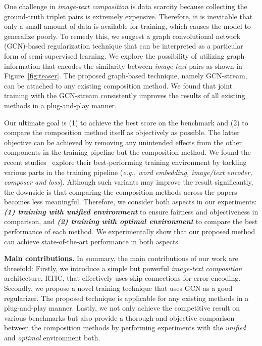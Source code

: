 \documentclass[10pt,twocolumn,letterpaper]{article}
\begin{document}
One challenge in \textit{image-text composition} is data scarcity because collecting the ground-truth triplet pairs is extremely expensive. Therefore, it is inevitable that only a small amount of data is available for training, which causes the model to generalize poorly. To remedy this, we suggest a graph convolutional network (GCN)-based regularization technique that can be interpreted as a particular form of semi-supervised learning. We explore the possibility of utilizing graph information that encodes the similarity between \textit{image-text} pairs as shown in Figure~\ref{fig:teaser}. The proposed graph-based technique, namely GCN-stream, can be attached to any existing composition method. We found that joint training with the GCN-stream consistently improves the results of all existing methods in a plug-and-play manner.

Our ultimate goal is (1) to achieve the best score on the benchmark and (2) to compare the composition method itself as objectively as possible. The latter objective can be achieved by removing any unintended effects from the other components in the training pipeline but the composition method. We found the recent studies~\cite{anwaar2020compositional,chen2020image,chen2020learning,jandial2020trace} explore their best-performing training environment by tackling various parts in the training pipeline (\textit{e.g., word embedding, image/text encoder, composer and loss}). Although such variants may improve the result significantly, the downside is that comparing the composition methods across the papers becomes less meaningful. Therefore, we consider both aspects in our experiments: \textbf{\textit{(1) training with unified environment}} to ensure fairness and objectiveness in comparison, and \textbf{\textit{(2) training with optimal environment}} to compare the best performance of each method. We experimentally show that our proposed method can achieve state-of-the-art performance in both aspects.

\textbf{Main contributions.} In summary, the main contributions of our work are threefold: Firstly, we introduce a simple but powerful \textit{image-text composition} architecture, RTIC, that effectively uses skip connections for error encoding. Secondly, we propose a novel training technique that uses GCN as a good regularizer. The proposed technique is applicable for any existing methods in a plug-and-play manner. Lastly, we not only achieve the competitive result on various benchmarks but also provide a thorough and objective comparison between the composition methods by performing experiments with the \textit{unified} and \textit{optimal} environment both.
\end{document}
